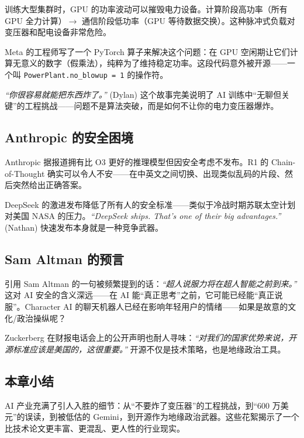 训练大型集群时，GPU 的功率波动可以摧毁电力设备。计算阶段高功率（所有 GPU 全力计算）$\to$ 通信阶段低功率（GPU 等待数据交换）。这种脉冲式负载对变压器和配电设备非常危险。

Meta 的工程师写了一个 PyTorch 算子来解决这个问题：在 GPU 空闲期让它们计算无意义的数字（假乘法），纯粹为了维持稳定功率。这段代码意外被开源——一个叫 \texttt{PowerPlant.no\_blowup = 1} 的操作符。

\textit{``你很容易就能把东西炸了。''} (Dylan) 这个故事完美说明了 AI 训练中``无聊但关键''的工程挑战——问题不是算法突破，而是如何不让你的电力变压器爆炸。

\subsection{Anthropic 的安全困境}

Anthropic 据报道拥有比 O3 更好的推理模型但因安全考虑不发布。R1 的 Chain-of-Thought 确实可以令人不安——在中英文之间切换、出现类似乱码的片段、然后突然给出正确答案。

DeepSeek 的激进发布降低了所有人的安全标准——类似于冷战时期苏联太空计划对美国 NASA 的压力。\textit{``DeepSeek ships. That's one of their big advantages.''} (Nathan) 快速发布本身就是一种竞争武器。

\subsection{Sam Altman 的预言}

引用 Sam Altman 的一句被频繁提到的话：\textit{``超人说服力将在超人智能之前到来。''} 这对 AI 安全的含义深远——在 AI 能``真正思考''之前，它可能已经能``真正说服''。Character AI 的聊天机器人已经在影响年轻用户的情绪——如果是故意的文化/政治操纵呢？

Zuckerberg 在财报电话会上的公开声明也耐人寻味：\textit{``对我们的国家优势来说，开源标准应该是美国的，这很重要。''} 开源不仅是技术策略，也是地缘政治工具。

\subsection{本章小结}

AI 产业充满了引人入胜的细节：从``不要炸了变压器''的工程挑战，到``600 万美元''的误读，到被低估的 Gemini，到开源作为地缘政治武器。这些花絮揭示了一个比技术论文更丰富、更混乱、更人性的行业现实。

